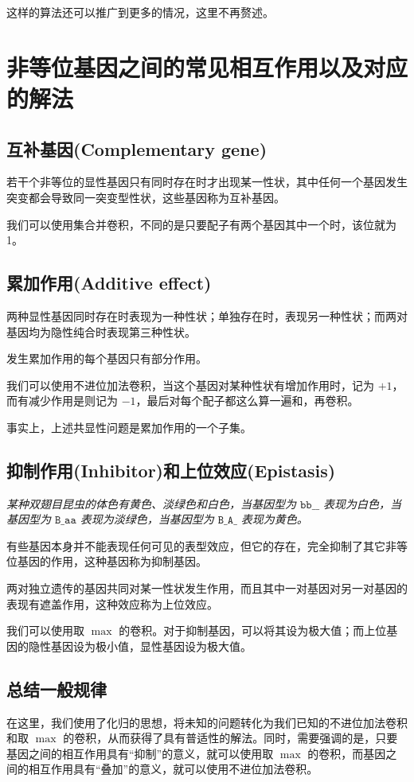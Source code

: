 \documentclass[12pt]{article} %
\begin{document}
这样的算法还可以推广到更多的情况，这里不再赘述。

\section{非等位基因之间的常见相互作用以及对应的解法}

\subsection{互补基因(Complementary gene)}

若干个非等位的显性基因只有同时存在时才出现某一性状，其中任何一个基因发生突变都会导致同一突变型性状，这些基因称为互补基因。

我们可以使用集合并卷积，不同的是只要配子有两个基因其中一个时，该位就为 1。

\subsection{累加作用(Additive effect)}

两种显性基因同时存在时表现为一种性状；单独存在时，表现另一种性状；而两对基因均为隐性纯合时表现第三种性状。

发生累加作用的每个基因只有部分作用。

我们可以使用不进位加法卷积，当这个基因对某种性状有增加作用时，记为 $+1$，而有减少作用是则记为 $-1$，最后对每个配子都这么算一遍和，再卷积。

事实上，上述共显性问题是累加作用的一个子集。

\subsection{抑制作用(Inhibitor)和上位效应(Epistasis)}

\textsl{某种双翅目昆虫的体色有黄色、淡绿色和白色，当基因型为 $\texttt{bb\_\_}$ 表现为白色，当基因型为 $\texttt{B\_aa}$ 表现为淡绿色，当基因型为 $\texttt{B\_A\_}$ 表现为黄色。}

有些基因本身并不能表现任何可见的表型效应，但它的存在，完全抑制了其它非等位基因的作用，这种基因称为抑制基因。

两对独立遗传的基因共同对某一性状发生作用，而且其中一对基因对另一对基因的表现有遮盖作用，这种效应称为上位效应。

我们可以使用取 $\max$ 的卷积。对于抑制基因，可以将其设为极大值；而上位基因的隐性基因设为极小值，显性基因设为极大值。

\subsection{总结一般规律}
在这里，我们使用了化归的思想，将未知的问题转化为我们已知的不进位加法卷积和取 $\max$ 的卷积，从而获得了具有普适性的解法。同时，需要强调的是，只要基因之间的相互作用具有“抑制”的意义，就可以使用取 $\max$ 的卷积，而基因之间的相互作用具有“叠加”的意义，就可以使用不进位加法卷积。
\end{document}
